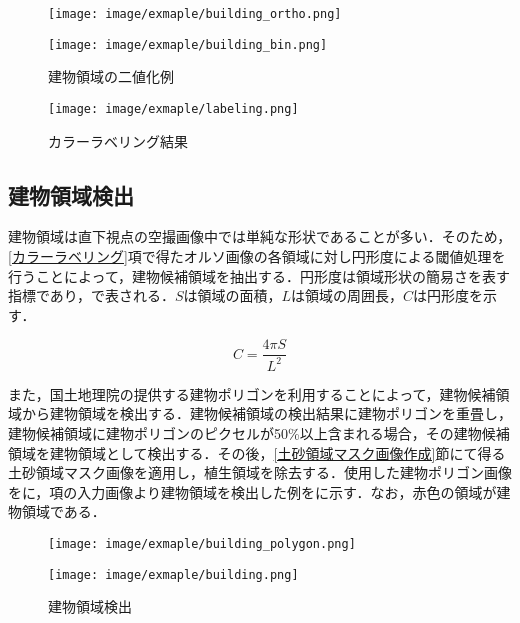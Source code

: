       \begin{figure}[t]
        \begin{minipage}[c]{0.45\hsize}
          \centering
          \texttt{[image: image/exmaple/building\_ortho.png]}
        \end{minipage}
        \begin{minipage}[c]{0.45\hsize}
          \centering
          \texttt{[image: image/exmaple/building\_bin.png]}
        \end{minipage}
        \caption{建物領域の二値化例}
        \label{建物領域の二値化例}
      \end{figure}

      \begin{figure}[t]
        \centering
        \texttt{[image: image/exmaple/labeling.png]}
        \caption{カラーラベリング結果}
        \label{カラーラベリング結果}
      \end{figure}


    \subsection{建物領域検出}
      \label{建物領域検出}
      建物領域は直下視点の空撮画像中では単純な形状であることが多い．そのため，\ref{カラーラベリング}項で得たオルソ画像の各領域に対し円形度による閾値処理を行うことによって，建物候補領域を抽出する．円形度は領域形状の簡易さを表す指標であり，で表される．$S$は領域の面積，$L$は領域の周囲長，$C$は円形度を示す．

      \begin{equation}
        \label{円形度}
        C = \dfrac{4 \pi S} {L^2} 
      \end{equation}

      また，国土地理院の提供する建物ポリゴンを利用することによって，建物候補領域から建物領域を検出する．建物候補領域の検出結果に建物ポリゴンを重畳し，建物候補領域に建物ポリゴンのピクセルが50\%以上含まれる場合，その建物候補領域を建物領域として検出する．その後，\ref{土砂領域マスク画像作成}節にて得る土砂領域マスク画像を適用し，植生領域を除去する．使用した建物ポリゴン画像をに，項の入力画像より建物領域を検出した例をに示す．なお，赤色の領域が建物領域である．

      \begin{figure}[t]
        \begin{minipage}[c]{0.45\hsize}
          \centering
          \texttt{[image: image/exmaple/building\_polygon.png]}
          \label{建物ポリゴン}
        \end{minipage}
        \begin{minipage}[c]{0.45\hsize}
          \centering
          \texttt{[image: image/exmaple/building.png]}
          \label{建物領域検出結果}
        \end{minipage}
        \caption{建物領域検出}
      \end{figure}



